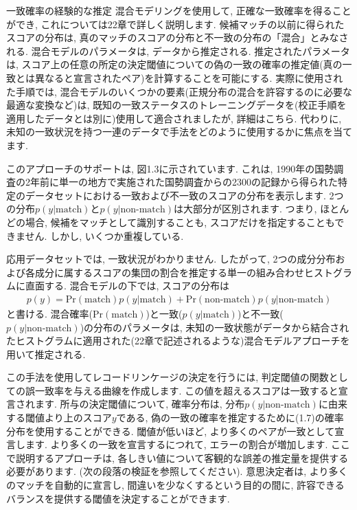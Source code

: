 \documentclass[10pt,dvipdfmx,a4]{beamer}
\newcommand{\eq}[1]{\begin{align}#1\end{align}}
\begin{document}

\begin{frame}{一致確率の経験的な推定}
混合モデリングを使用して, 正確な一致確率を得ることができ, これについては22章で詳しく説明します.
候補マッチの以前に得られたスコアの分布は, 真のマッチのスコアの分布と不一致の分布の「混合」とみなされる.
混合モデルのパラメータは, データから推定される.
推定されたパラメータは, スコア上の任意の所定の決定閾値についての偽の一致の確率の推定値(真の一致とは異なると宣言されたペア)を計算することを可能にする.
実際に使用された手順では, 混合モデルのいくつかの要素(正規分布の混合を許容するのに必要な最適な変換など)は, 既知の一致ステータスのトレーニングデータを(校正手順を適用したデータとは別に)使用して適合されましたが, 詳細はこちら.
代わりに, 未知の一致状況を持つ一連のデータで手法をどのように使用するかに焦点を当てます.

このアプローチのサポートは, 図1.3に示されています.
これは, 1990年の国勢調査の2年前に単一の地方で実施された国勢調査からの2300の記録から得られた特定のデータセットにおける一致および不一致のスコアの分布を表示します.
2つの分布$p(y|\text{match})$と$p(y|\text{non-match})$は大部分が区別されます.
つまり, ほとんどの場合, 候補をマッチとして識別することも, スコアだけを指定することもできません.
しかし, いくつか重複している.
\end{frame}


\begin{frame}
応用データセットでは, 一致状況がわかりません.
したがって, 2つの成分分布および各成分に属するスコアの集団の割合を推定する単一の組み合わせヒストグラムに直面する.
混合モデルの下では, スコアの分布は
\eq{p(y)=\text{Pr}(\text{match})p(y|\text{match})+\text{Pr}(\text{non-match})p(y|\text{non-match})}
と書ける.
混合確率($\text{Pr}(\text{match})$)と一致($p(y|\text{match})$)と不一致($p(y|\text{non-match})$)の分布のパラメータは, 未知の一致状態がデータから結合されたヒストグラムに適用された(22章で記述されるような)混合モデルアプローチを用いて推定される.

この手法を使用してレコードリンケージの決定を行うには, 判定閾値の関数としての誤一致率を与える曲線を作成します.
この値を超えるスコアは一致すると宣言されます.
所与の決定閾値について, 確率分布は, 分布$p(y|\text{non-match})$に由来する閾値より上のスコア$y$である, 偽の一致の確率を推定するために(1.7)の確率分布を使用することができる.
閾値が低いほど, より多くのペアが一致として宣言します.
より多くの一致を宣言するにつれて, エラーの割合が増加します.
ここで説明するアプローチは, 各しきい値について客観的な誤差の推定量を提供する必要があります.
(次の段落の検証を参照してください).
意思決定者は, より多くのマッチを自動的に宣言し, 間違いを少なくするという目的の間に, 許容できるバランスを提供する閾値を決定することができます.
\end{frame}
\end{document}
